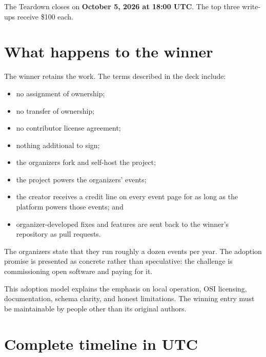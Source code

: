 \documentclass[11pt]{article}
\begin{document}
The Teardown closes on \textbf{October 5, 2026 at 18:00 UTC}. The top three write-ups receive \$100 each.

\section{What happens to the winner}

The winner retains the work. The terms described in the deck include:

\begin{itemize}
  \item no assignment of ownership;
  \item no transfer of ownership;
  \item no contributor license agreement;
  \item nothing additional to sign;
  \item the organizers fork and self-host the project;
  \item the project powers the organizers' events;
  \item the creator receives a credit line on every event page for as long as the platform powers those events; and
  \item organizer-developed fixes and features are sent back to the winner's repository as pull requests.
\end{itemize}

The organizers state that they run roughly a dozen events per year. The adoption promise is presented as concrete rather than speculative: the challenge is commissioning open software and paying for it.

\begin{infobox}
This adoption model explains the emphasis on local operation, OSI licensing, documentation, schema clarity, and honest limitations. The winning entry must be maintainable by people other than its original authors.
\end{infobox}

\section{Complete timeline in UTC}
\end{document}

